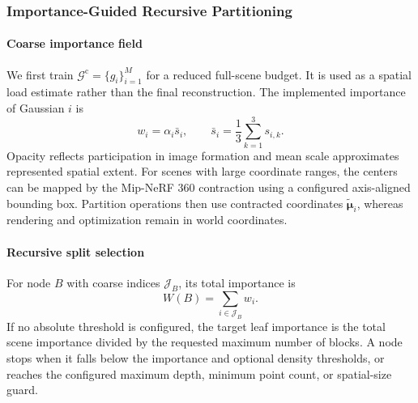 \documentclass[conference]{IEEEtran}
\begin{document}
\subsubsection{Importance-Guided Recursive Partitioning}
\paragraph{Coarse importance field}
We first train $\mathcal{G}^{\mathrm{c}}=\{g_i\}_{i=1}^{M}$ for a reduced full-scene budget. It is used as a spatial load estimate rather than the final reconstruction. The implemented importance of Gaussian $i$ is
\begin{equation}
w_i=\alpha_i\bar{s}_i,\qquad
\bar{s}_i=\frac{1}{3}\sum_{k=1}^{3}s_{i,k}.
\label{eq:importance}
\end{equation}
Opacity reflects participation in image formation and mean scale approximates represented spatial extent. For scenes with large coordinate ranges, the centers can be mapped by the Mip-NeRF 360 contraction \cite{barron2022mipnerf360} using a configured axis-aligned bounding box. Partition operations then use contracted coordinates $\tilde{\boldsymbol{\mu}}_i$, whereas rendering and optimization remain in world coordinates.

\paragraph{Recursive split selection}
For node $B$ with coarse indices $\mathcal{J}_B$, its total importance is
\begin{equation}
W(B)=\sum_{i\in\mathcal{J}_B}w_i.
\label{eq:blockimportance}
\end{equation}
If no absolute threshold is configured, the target leaf importance is the total scene importance divided by the requested maximum number of blocks. A node stops when it falls below the importance and optional density thresholds, or reaches the configured maximum depth, minimum point count, or spatial-size guard.
\end{document}
